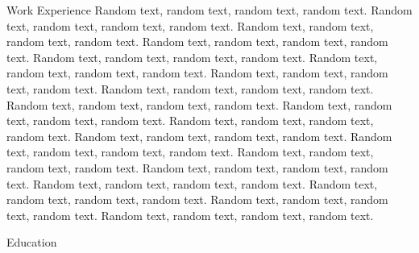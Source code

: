 \documentclass[purpleprocv]{procv}
\begin{document}
\begin{procv-twocolumns}
\begin{experience}{Work Experience}
{           \newline
           Random text, random text, random text, random text.}
          {Random text, random text, random text, random text. Random text, random text, random text, random text.
           \newline
           Random text, random text, random text, random text.}
          {Random text, random text, random text, random text. Random text, random text, random text, random text.
           \newline
           Random text, random text, random text, random text.}
          {Random text, random text, random text, random text. Random text, random text, random text, random text.
           \newline
           Random text, random text, random text, random text.}
          {Random text, random text, random text, random text. Random text, random text, random text, random text.
           \newline
           Random text, random text, random text, random text.}
          {Random text, random text, random text, random text. Random text, random text, random text, random text.
           \newline
           Random text, random text, random text, random text.}
          {Random text, random text, random text, random text. Random text, random text, random text, random text.
           \newline
           Random text, random text, random text, random text.}
        \end{experience}
        \newpage
        \begin{experience}{Education}
\end{experience}
\end{procv-twocolumns}
\end{document}
